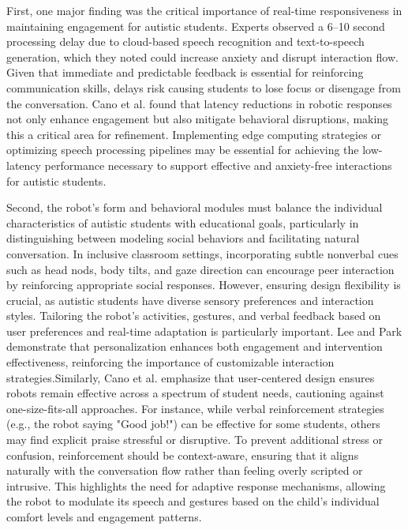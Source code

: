 First, one major finding was the critical importance of real-time responsiveness in maintaining engagement for autistic students. Experts observed a 6–10 second processing delay due to cloud-based speech recognition and text-to-speech generation, which they noted could increase anxiety and disrupt interaction flow. Given that immediate and predictable feedback is essential for reinforcing communication skills, delays risk causing students to lose focus or disengage from the conversation. Cano et al. \cite{cano2023design} found that latency reductions in robotic responses not only enhance engagement but also mitigate behavioral disruptions, making this a critical area for refinement. Implementing edge computing strategies or optimizing speech processing pipelines may be essential for achieving the low-latency performance necessary to support effective and anxiety-free interactions for autistic students.

Second, the robot’s form and behavioral modules must balance the individual characteristics of autistic students with educational goals, particularly in distinguishing between modeling social behaviors and facilitating natural conversation. In inclusive classroom settings, incorporating subtle nonverbal cues such as head nods, body tilts, and gaze direction can encourage peer interaction by reinforcing appropriate social responses. However, ensuring design flexibility is crucial, as autistic students have diverse sensory preferences and interaction styles. Tailoring the robot’s activities, gestures, and verbal feedback based on user preferences and real-time adaptation is particularly important. Lee and Park  \cite{maroto2024personalizing} demonstrate that personalization enhances both engagement and intervention effectiveness, reinforcing the importance of customizable interaction strategies.Similarly, Cano et al. \cite{cano2023design} emphasize that user-centered design ensures robots remain effective across a spectrum of student needs, cautioning against one-size-fits-all approaches. For instance, while verbal reinforcement strategies (e.g., the robot saying "Good job!") can be effective for some students, others may find explicit praise stressful or disruptive. To prevent additional stress or confusion, reinforcement should be context-aware, ensuring that it aligns naturally with the conversation flow rather than feeling overly scripted or intrusive. This highlights the need for adaptive response mechanisms, allowing the robot to modulate its speech and gestures based on the child's individual comfort levels and engagement patterns.

